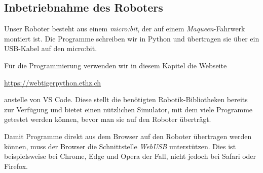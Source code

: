 \subsection*{Inbetriebnahme des Roboters}

Unser Roboter besteht aus einem \emph{micro:bit}, der auf
einem \emph{Maqueen}-Fahrwerk montiert ist. Die Programme
schreiben wir in Python und übertragen sie über ein
USB-Kabel auf den micro:bit.


\begin{myremark}
    Für die Programmierung verwenden wir in diesem Kapitel
    die Webseite
    \begin{center}\url{https://webtigerpython.ethz.ch}\end{center}
    anstelle von VS Code. Diese stellt die benötigten
    Robotik-Bibliotheken bereits zur Verfügung und bietet
    einen nützlichen Simulator, mit dem viele Programme
    getestet werden können, bevor man sie auf den
    Roboter überträgt.

    Damit Programme direkt aus dem Browser auf den Roboter
    übertragen werden können, muss der Browser die
    Schnittstelle \emph{WebUSB} unterstützen. Dies ist
    beispielsweise bei Chrome, Edge und Opera der Fall,
    nicht jedoch bei Safari oder Firefox.
\end{myremark}


